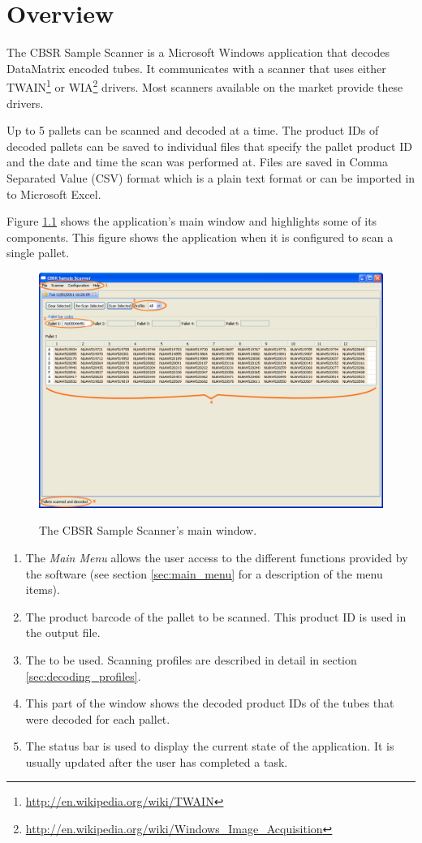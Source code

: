 \chapter{Overview}
The CBSR Sample Scanner is a Microsoft Windows application that decodes
DataMatrix encoded tubes. It communicates with a scanner that
uses either TWAIN\footnote{\url{http://en.wikipedia.org/wiki/TWAIN}} or
WIA\footnote{\url{http://en.wikipedia.org/wiki/Windows_Image_Acquisition}}
drivers. Most scanners available on the market provide these
drivers.

Up to 5 pallets can be scanned and decoded at a time. The product IDs of
decoded pallets can be saved to individual files that specify the pallet
product ID and the date and time the scan was performed at. Files are saved in
Comma Separated Value (CSV) format which is a plain text format or can be
imported in to Microsoft Excel.

Figure \ref{fig:main_window} shows the application's main window and highlights
some of its components. This figure shows the application when it is configured
to scan a single pallet.
\begin{figure}[H]
  \centering
  \scalebox{0.35}
	   { \includegraphics*{screenshots/overview/main_window} }
	   \caption{The CBSR Sample Scanner's main window.}
	   \label{fig:main_window}
\end{figure}
\begin{enumerate}
\item The \emph{Main Menu} allows the user access to the different
  functions provided by the software (see section \ref{sec:main_menu} for a
  description of the menu items).
\item The product barcode of the pallet to be scanned. This product ID is
  used in the output file.
\item The  to be used. Scanning profiles are described in
  detail in section \ref{sec:decoding_profiles}.
\item This part of the window shows the decoded product IDs of the tubes
  that were decoded for each pallet.
\item The status bar is used to display the current state of the
  application. It is usually updated after the user has completed a task.
\end{enumerate}


